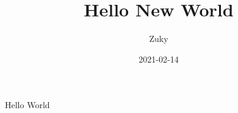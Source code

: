 \documentclass{article}
\title{Hello New World}
\date{2021-02-14}
\author{Zuky}
\begin{document}
	\maketitle
	\newpage
	Hello World
\end{document}
